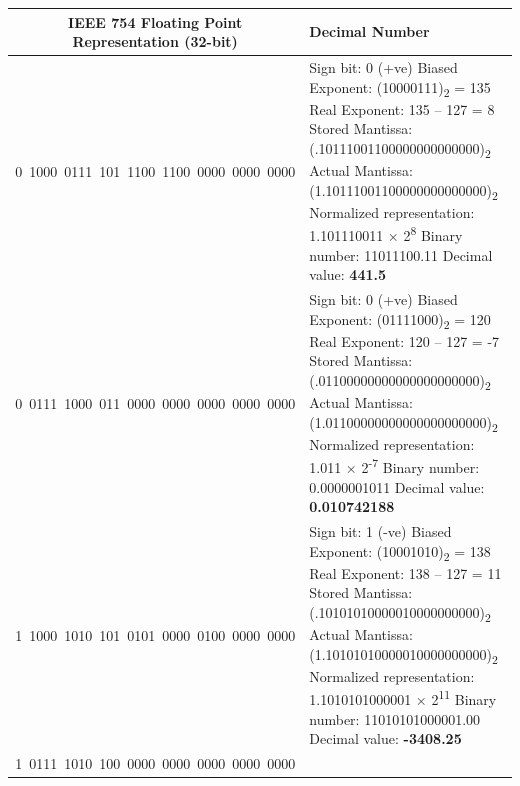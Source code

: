 {\small
\begin{longtable}{|c|p{10cm}|}
\hline
\textbf{IEEE 754 Floating Point Representation (32-bit)} & \textbf{Decimal Number} \\
\hline
0\ 1000\ 0111\ 101\ 1100\ 1100\ 0000\ 0000\ 0000 & 
Sign bit: 0 (+ve) \newline
Biased Exponent: (10000111)\textsubscript{2} = 135 \newline
Real Exponent: 135 – 127 = 8 \newline
Stored Mantissa: (.10111001100000000000000)\textsubscript{2} \newline
Actual Mantissa: (1.10111001100000000000000)\textsubscript{2} \newline
Normalized representation: 1.101110011 × 2\textsuperscript{8} \newline
Binary number: 11011100.11 \newline
Decimal value: \textbf{441.5} \\
\hline
0\ 0111\ 1000\ 011\ 0000\ 0000\ 0000\ 0000\ 0000 & 
Sign bit: 0 (+ve) \newline
Biased Exponent: (01111000)\textsubscript{2} = 120 \newline
Real Exponent: 120 – 127 = -7 \newline
Stored Mantissa: (.01100000000000000000000)\textsubscript{2} \newline
Actual Mantissa: (1.01100000000000000000000)\textsubscript{2} \newline
Normalized representation: 1.011 × 2\textsuperscript{-7} \newline
Binary number: 0.0000001011 \newline
Decimal value: \textbf{0.010742188} \\
\hline
1\ 1000\ 1010\ 101\ 0101\ 0000\ 0100\ 0000\ 0000 & 
Sign bit: 1 (-ve) \newline
Biased Exponent: (10001010)\textsubscript{2} = 138 \newline
Real Exponent: 138 – 127 = 11 \newline
Stored Mantissa: (.10101010000010000000000)\textsubscript{2} \newline
Actual Mantissa: (1.10101010000010000000000)\textsubscript{2} \newline
Normalized representation: 1.1010101000001 × 2\textsuperscript{11} \newline
Binary number: 11010101000001.00 \newline
Decimal value: \textbf{-3408.25} \\
\hline
1\ 0111\ 1010\ 100\ 0000\ 0000\ 0000\ 0000\ 0000 & 

\end{longtable}}
